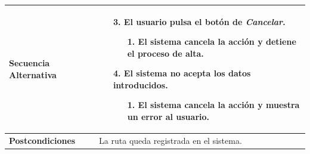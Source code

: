 \begin{longtable}{| p{4cm} | p{10cm} |}
\\
\hline
\textbf{Secuencia Alternativa} &\mbox{}\par\vspace{-\baselineskip}
\begin{enumerate}[leftmargin=0.9cm, topsep=0.1cm]
\item[3.] El usuario pulsa el botón de \textit{Cancelar}.
	\begin{itemize}
	\item[1.] El sistema cancela la acción y detiene el proceso de alta.
	\end{itemize}
\item[4.] El sistema no acepta los datos introducidos.
	\begin{itemize}
	\item[1.] El sistema cancela la acción y muestra un error al usuario.
	\end{itemize}
\end{enumerate}
\\

\hline
\textbf{Postcondiciones} & 
La ruta queda registrada en el sistema.\\
\hline
\end{longtable}



\newpage
